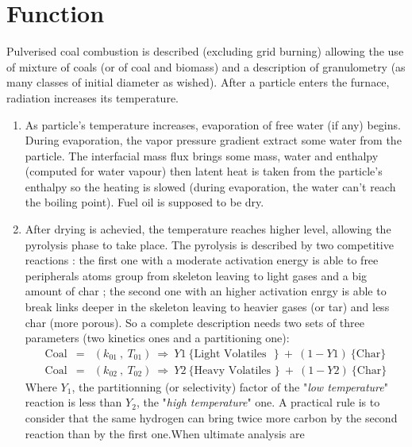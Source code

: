 
\section{Function}

Pulverised coal combustion is described (excluding grid burning) allowing the
use of mixture of coals (or of coal and biomass) and a description of
granulometry (as many classes of initial diameter as wished). After a particle
enters the furnace, radiation increases its temperature.
\begin{enumerate}
\item As particle's temperature increases, evaporation of free water (if any)
  begins. During evaporation, the vapor pressure gradient extract some water
  from the particle. The interfacial mass flux brings some mass, water and
  enthalpy (computed for water vapour) then latent heat is taken from the
  particle's enthalpy so the heating is slowed (during evaporation, the water
  can't reach the boiling point). Fuel oil is supposed to be dry.
\item After drying is achevied, the temperature reaches higher level, allowing
  the pyrolysis phase to take place. The pyrolysis is described by two
  competitive reactions : the first one with a moderate activation energy is
  able to free peripherals atoms group from skeleton leaving to light gases and
  a big amount of char ; the second one with an higher activation enrgy is able
  to break links deeper in the skeleton leaving to heavier gases (or tar) and
  less char (more porous). So a complete description needs two sets of three
  parameters (two kinetics ones and a partitioning one):
\begin{eqnarray}
\mbox{Coal} &=&(k_{01}~,~ T_{01}) ~\Rightarrow~ Y1~\{ \mbox{Light Volatiles~~}\} ~+~ (1-Y1)~\{ \mbox{Char} \} \\
\mbox{Coal} &=&(k_{02}~,~ T_{02}) ~\Rightarrow~ Y2~\{\mbox{Heavy Volatiles~} \}   ~+~ (1-Y2)~\{ \mbox{Char} \}
\end{eqnarray}
Where $Y_1$, the partitionning (or selectivity) factor of the "{\em low
  temperature}" reaction is less than $Y_2$, the "{\em high temperature}" one.
A practical rule is to consider that the same hydrogen can bring twice more
carbon by the second reaction than by the first one.When ultimate analysis are

\end{enumerate}

